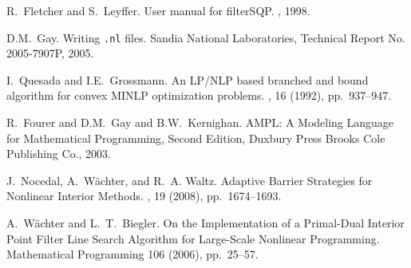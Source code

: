 \begin{thebibliography}{10}
R.~Fletcher and S.~Leyffer.
\newblock User manual for filter{SQP}.
, 1998.

D.M.~Gay.
\newblock Writing \texttt{.nl} files.
\newblock Sandia National Laboratories, Technical Report No. 2005-7907P, 2005.

I.~Quesada and I.E.~Grossmann.
\newblock An {LP/NLP} based branched and bound algorithm for convex {MINLP} optimization problems.
, 16 (1992), pp.~937--947.
\newblock {}

R.~Fourer and D.M.~Gay and B.W.~Kernighan.
\newblock AMPL: A Modeling Language for Mathematical
Programming, Second Edition,
\newblock Duxbury Press Brooks Cole Publishing Co., 2003.


J.~Nocedal, A.~W\"achter, and R.~A. Waltz.
\newblock Adaptive Barrier Strategies for Nonlinear Interior Methods.
, 19 (2008), pp.~1674--1693.
\newblock {}

A.~W\"achter and L.~T.~Biegler.
\newblock On the Implementation of a Primal-Dual Interior Point Filter Line Search Algorithm for Large-Scale Nonlinear Programming.
\newblock Mathematical Programming 106 (2006), pp.~25--57.
\newblock {}
\end{thebibliography}
